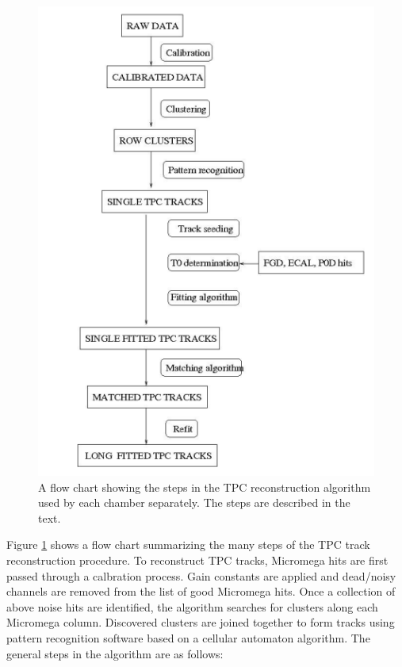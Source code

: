 \begin{figure}
\centering
\includegraphics[width=5.5in]{Figures/Reconstruction/tpcrecoflow.PNG}
\caption{A flow chart showing the steps in the TPC reconstruction algorithm used by each chamber separately. The steps are described in the text.} 
\label{fig:tpcrecoflow}
\end{figure}

Figure \ref{fig:tpcrecoflow} shows a flow chart summarizing the many steps of the TPC track reconstruction procedure. To reconstruct TPC tracks, Micromega hits are first passed through a calbration process. Gain constants are applied and dead/noisy channels are removed from the list of good Micromega hits. Once a collection of above noise hits are identified, the algorithm searches for clusters along each Micromega column. Discovered clusters are joined together to form tracks using pattern recognition software based on a cellular automaton algorithm. The general steps in the algorithm are as follows:

